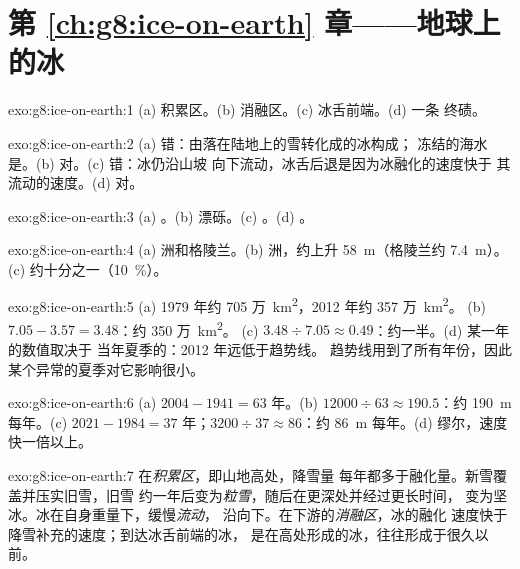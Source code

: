 \section*{第 \ref{ch:g8:ice-on-earth} 章——地球上的冰}

\begin{solution}{exo:g8:ice-on-earth:1}
(a) 积累区。(b) 消融区。(c) 冰舌前端。(d) 一条
终碛。
\end{solution}

\begin{solution}{exo:g8:ice-on-earth:2}
(a) 错：由落在陆地上的雪转化成的冰构成；
冻结的海水是。(b) 对。(c) 错：冰仍沿山坡
向下流动，冰舌后退是因为冰融化的速度快于
其流动的速度。(d) 对。
\end{solution}

\begin{solution}{exo:g8:ice-on-earth:3}
(a) 。(b) 漂砾。(c) 。(d) 。
\end{solution}

\begin{solution}{exo:g8:ice-on-earth:4}
(a) 洲和格陵兰。(b) 洲，约上升
\qty{58}{m}（格陵兰约 \qty{7.4}{m}）。(c) 约十分之一（10~\%）。
\end{solution}

\begin{solution}{exo:g8:ice-on-earth:5}
(a) 1979 年约 705 万~\unit{km^2}，2012 年约 357 万~\unit{km^2}。
(b) $7.05 - 3.57 = 3.48$：约 350 万~\unit{km^2}。
(c) $3.48 \div 7.05 \approx 0.49$：约一半。(d) 某一年的数值取决于
当年夏季的：2012 年远低于趋势线。
趋势线用到了所有年份，因此某个异常的夏季对它影响很小。
\end{solution}

\begin{solution}{exo:g8:ice-on-earth:6}
(a) $2004 - 1941 = 63$ 年。(b) $12000 \div 63 \approx 190.5$：约
\qty{190}{m} 每年。(c) $2021 - 1984 = 37$ 年；$3200 \div 37 \approx
86$：约 \qty{86}{m} 每年。(d) 缪尔，速度快一倍以上。
\end{solution}

\begin{solution}{exo:g8:ice-on-earth:7}
在\emph{积累区}，即山地高处，降雪量
每年都多于融化量。新雪覆盖并压实旧雪，旧雪
约一年后变为\emph{粒雪}，随后在更深处并经过更长时间，
变为坚冰。冰在自身重量下，缓慢\emph{流动}，
沿向下。在下游的\emph{消融区}，冰的融化
速度快于降雪补充的速度；到达冰舌前端的冰，
是在高处形成的冰，往往形成于很久以前。
\end{solution}

